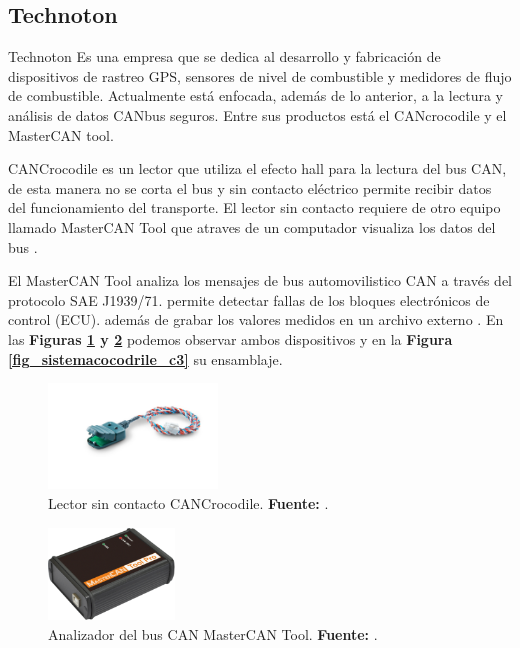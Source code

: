 \subsection{Technoton}
Technoton  Es una empresa que se dedica al desarrollo y fabricación de dispositivos de rastreo GPS, sensores de nivel de combustible y medidores de flujo de combustible. Actualmente está enfocada, además de lo anterior, a la lectura y análisis de datos CANbus seguros\cite{cite_technoton_c3}. Entre sus productos está el CANcrocodile y  el MasterCAN tool. 


CANCrocodile es un lector que utiliza el efecto hall para la lectura del bus CAN, de esta manera no se corta el bus y sin contacto eléctrico permite recibir datos del funcionamiento del transporte.  El lector sin contacto requiere de otro equipo llamado  MasterCAN Tool que atraves de un computador visualiza los datos del bus \cite{cite_cocodrile_c3}. 


El MasterCAN Tool analiza los mensajes de bus automovilistico CAN a través del protocolo SAE J1939/71. permite detectar fallas de los bloques electrónicos de control (ECU). además de grabar los valores medidos en un archivo externo \cite{cite_mastertool_c3}. En las   \textbf{Figuras \ref{fig_cocodrile_c3} y \ref{fig_mastertool_c3}} podemos observar ambos dispositivos y en la \textbf{Figura \ref{fig_sistemacocodrile_c3}} su ensamblaje. 


\begin{figure}[H]
	\centering
	\includegraphics[width=0.4\textwidth]{./Cap3imagen/cocodrile.jpg}
	\caption[Lector sin contacto CANCrocodile.]{Lector sin contacto CANCrocodile.\textbf{ Fuente:} \cite{cite_cocodrile_c3}.}
	\label{fig_cocodrile_c3} %
\end{figure}


\begin{figure}[H]
	\centering
	\includegraphics[width=0.3\textwidth]{./Cap3imagen/mastercan-tool.png}
	\caption[Analizador del bus CAN MasterCAN Tool.]{Analizador del bus CAN MasterCAN Tool.\textbf{ Fuente:} \cite{cite_mastertool_c3}.}
	\label{fig_mastertool_c3} %
\end{figure}

